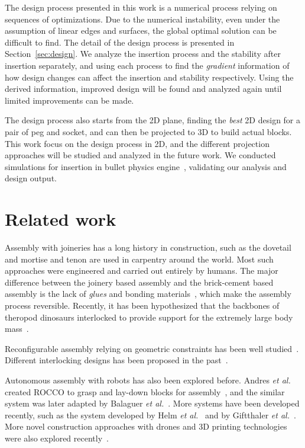 \documentclass[letterpaper, 10 pt, conference]{ieeeconf}
\begin{document}
The design process presented in this work is a numerical process relying on sequences of optimizations. Due to the numerical instability, even under the assumption of linear edges and surfaces, the global optimal solution can be difficult to find. The detail of the design process is presented in Section~\ref{sec:design}. We analyze the insertion process and the stability after insertion separately, and using each process to find the {\em gradient} information of how design changes can affect the insertion and stability respectively. Using the derived information, improved design will be found and analyzed again until limited improvements can be made. 

The design process also starts from the 2D plane, finding the {\em best} 2D design for a pair of peg and socket, and can then be projected to 3D to build actual blocks. This work focus on the design process in 2D, and the different projection approaches will be studied and analyzed in the future work. We conducted simulations for insertion in bullet physics engine~\cite{coumans2019}, validating our analysis and design output. 



\section{Related work}

Assembly with joineries has a long history in construction, such as the dovetail and mortise and tenon are used in carpentry around the world. Most such approaches were engineered and carried out entirely by humans. The major difference between the joinery based assembly and the brick-cement based assembly is the lack of {\em glues} and bonding materials~\cite{zwerger2012wood}, which make the assembly process reversible. Recently, it has been hypothesized that the backbones of theropod dinosaurs interlocked to provide support for the extremely large body mass~\cite{woodruff2016}.

Reconfigurable assembly relying on geometric constraints has been well studied~\cite{song2012recursive, song2017reconfigurable, songcofifab, fu2015computational, Wang-2018-DESIA}. Different interlocking designs has been proposed in the past~\cite{Yao:2017:IDS:3068851.3054740}. 

Autonomous assembly with robots has also been explored before. Andres {\em et al.} created ROCCO to grasp and lay-down blocks for assembly~\cite{andres1994first}, and the similar system was later adapted by Balaguer {\em et al.}~\cite{balaguer1996site}. More systems have been developed recently, such as the system developed by Helm {\em et al.}~\cite{helm2012mobile} and by Giftthaler {\em et al.}~\cite{giftthaler2017mobile}. More novel construction approaches with drones and 3D printing technologies were also explored recently~\cite{willmann2012aerial, augugliaro2014flight, lindsey2011construction, augugliaro2013building, keating2017toward, winsun3dprint}. 
\end{document}

